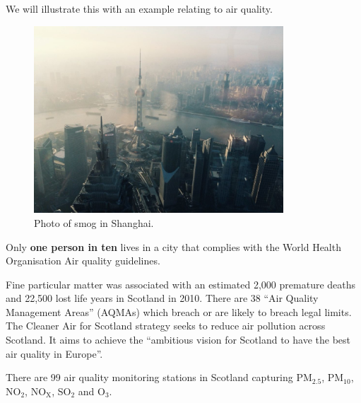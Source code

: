 \documentclass[
  letterpaper,
  DIV=11,
  numbers=noendperiod]{scrartcl}
\begin{document}
\begin{tcolorbox}[enhanced jigsaw, coltitle=black, colframe=quarto-callout-important-color-frame, bottomrule=.15mm, leftrule=.75mm, toptitle=1mm, titlerule=0mm, title={Example: Air quality}, bottomtitle=1mm, toprule=.15mm, rightrule=.15mm, arc=.35mm, opacityback=0, opacitybacktitle=0.6, left=2mm, colbacktitle=quarto-callout-important-color!10!white, breakable, colback=white]

We will illustrate this with an example relating to air quality.

\begin{figure}[H]

{\centering \includegraphics[width=3.67708in,height=\textheight]{images/Shanghai.jpg}

}

\caption{Photo of smog in Shanghai.}

\end{figure}%

Only \textbf{one person in ten} lives in a city that complies with the
World Health Organisation Air quality guidelines.

Fine particular matter was associated with an estimated 2,000 premature
deaths and 22,500 lost life years in Scotland in 2010. There are 38
``Air Quality Management Areas'' (AQMAs) which breach or are likely to
breach legal limits. The Cleaner Air for Scotland strategy seeks to
reduce air pollution across Scotland. It aims to achieve the ``ambitious
vision for Scotland to have the best air quality in Europe''.

There are 99 air quality monitoring stations in Scotland capturing
PM\(_{2.5}\), PM\(_{10}\), NO\(_2\), NO\(_\text{X}\), SO\(_2\) and
O\(_3\).


\end{tcolorbox}
\end{document}
